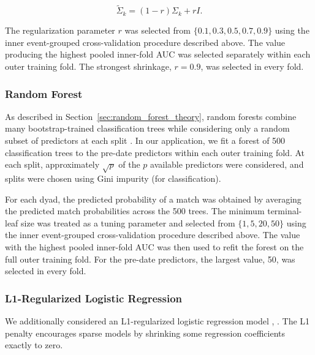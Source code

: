 \begin{equation}
\widetilde{\Sigma}_k
=
(1-r)\Sigma_k + rI.
\end{equation}

The regularization parameter $r$ was selected from
$\{0.1, 0.3, 0.5, 0.7, 0.9\}$
using the inner event-grouped cross-validation procedure described above. The value producing the highest pooled inner-fold AUC was selected separately within each outer training fold. The strongest shrinkage, $r=0.9$, was selected in every fold.

\subsubsection{Random Forest}

As described in Section~\ref{sec:random_forest_theory}, random forests combine many bootstrap-trained classification trees while considering only a random subset of predictors at each split \cite{Breiman:2001}. In our application, we fit a forest of 500 classification trees to the pre-date predictors within each outer training fold. At each split, approximately $\sqrt{p}$ of the $p$ available predictors were considered, and splits were chosen using Gini impurity (for classification).

For each dyad, the predicted probability of a match was obtained by averaging the predicted match probabilities across the 500 trees. The minimum terminal-leaf size was treated as a tuning parameter and selected from $\{1,5,20,50\}$ using the inner event-grouped cross-validation procedure described above. The value with the highest pooled inner-fold AUC was then used to refit the forest on the full outer training fold. For the pre-date predictors, the largest value, 50, was selected in every fold.

\subsubsection{L1-Regularized Logistic Regression}

We additionally considered an L1-regularized logistic regression model \cite[Section 6.2.2, pp.~244--252]{James:2023}, \cite[Section 4.4.4, Eq.~(4.31), p.~125]{Hastie:2009}. The L1 penalty encourages sparse models by shrinking some regression coefficients exactly to zero.

